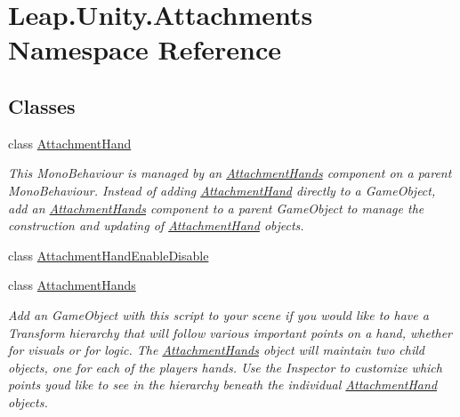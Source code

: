 \hypertarget{namespace_leap_1_1_unity_1_1_attachments}{}\section{Leap.\+Unity.\+Attachments Namespace Reference}
\label{namespace_leap_1_1_unity_1_1_attachments}
\subsection*{Classes}
\begin{DoxyCompactItemize}
\item 
class \mbox{\hyperlink{class_leap_1_1_unity_1_1_attachments_1_1_attachment_hand}{Attachment\+Hand}}
\begin{DoxyCompactList}\small\item\em This Mono\+Behaviour is managed by an \mbox{\hyperlink{class_leap_1_1_unity_1_1_attachments_1_1_attachment_hands}{Attachment\+Hands}} component on a parent Mono\+Behaviour. Instead of adding \mbox{\hyperlink{class_leap_1_1_unity_1_1_attachments_1_1_attachment_hand}{Attachment\+Hand}} directly to a Game\+Object, add an \mbox{\hyperlink{class_leap_1_1_unity_1_1_attachments_1_1_attachment_hands}{Attachment\+Hands}} component to a parent Game\+Object to manage the construction and updating of \mbox{\hyperlink{class_leap_1_1_unity_1_1_attachments_1_1_attachment_hand}{Attachment\+Hand}} objects. \end{DoxyCompactList}\item 
class \mbox{\hyperlink{class_leap_1_1_unity_1_1_attachments_1_1_attachment_hand_enable_disable}{Attachment\+Hand\+Enable\+Disable}}
\item 
class \mbox{\hyperlink{class_leap_1_1_unity_1_1_attachments_1_1_attachment_hands}{Attachment\+Hands}}
\begin{DoxyCompactList}\small\item\em Add an Game\+Object with this script to your scene if you would like to have a Transform hierarchy that will follow various important points on a hand, whether for visuals or for logic. The \mbox{\hyperlink{class_leap_1_1_unity_1_1_attachments_1_1_attachment_hands}{Attachment\+Hands}} object will maintain two child objects, one for each of the player\textquotesingle{}s hands. Use the Inspector to customize which points you\textquotesingle{}d like to see in the hierarchy beneath the individual \mbox{\hyperlink{class_leap_1_1_unity_1_1_attachments_1_1_attachment_hand}{Attachment\+Hand}} objects. \end{DoxyCompactList}\item 

\end{DoxyCompactItemize}
